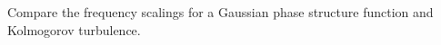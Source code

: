 \TODO\quad Compare the frequency scalings for a Gaussian phase structure function and Kolmogorov turbulence.
